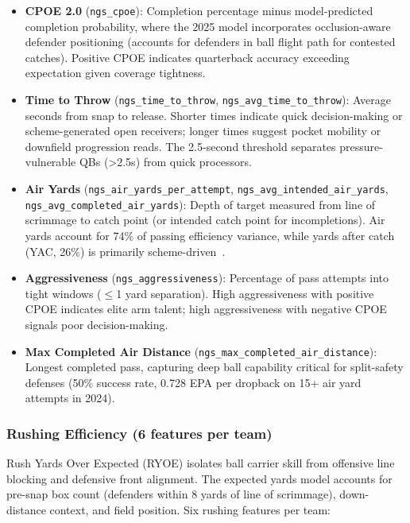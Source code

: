 \begin{itemize}
  \item \textbf{CPOE 2.0} (\texttt{ngs\_cpoe}): Completion percentage minus model-predicted completion probability, where the 2025 model incorporates occlusion-aware defender positioning (accounts for defenders in ball flight path for contested catches). Positive CPOE indicates quarterback accuracy exceeding expectation given coverage tightness.

  \item \textbf{Time to Throw} (\texttt{ngs\_time\_to\_throw}, \texttt{ngs\_avg\_time\_to\_throw}): Average seconds from snap to release. Shorter times indicate quick decision-making or scheme-generated open receivers; longer times suggest pocket mobility or downfield progression reads. The 2.5-second threshold separates pressure-vulnerable QBs (>2.5s) from quick processors.

  \item \textbf{Air Yards} (\texttt{ngs\_air\_yards\_per\_attempt}, \texttt{ngs\_avg\_intended\_air\_yards}, \texttt{ngs\_avg\_completed\_air\_yards}): Depth of target measured from line of scrimmage to catch point (or intended catch point for incompletions). Air yards account for 74\% of passing efficiency variance, while yards after catch (YAC, 26\%) is primarily scheme-driven~\cite{yurko2020going}.

  \item \textbf{Aggressiveness} (\texttt{ngs\_aggressiveness}): Percentage of pass attempts into tight windows ($\le$1 yard separation). High aggressiveness with positive CPOE indicates elite arm talent; high aggressiveness with negative CPOE signals poor decision-making.

  \item \textbf{Max Completed Air Distance} (\texttt{ngs\_max\_completed\_air\_distance}): Longest completed pass, capturing deep ball capability critical for split-safety defenses (50\% success rate, 0.728 EPA per dropback on 15+ air yard attempts in 2024).
\end{itemize}

\subsubsection{Rushing Efficiency (6 features per team)}

Rush Yards Over Expected (RYOE) isolates ball carrier skill from offensive line blocking and defensive front alignment. The expected yards model accounts for pre-snap box count (defenders within 8 yards of line of scrimmage), down-distance context, and field position. Six rushing features per team:

